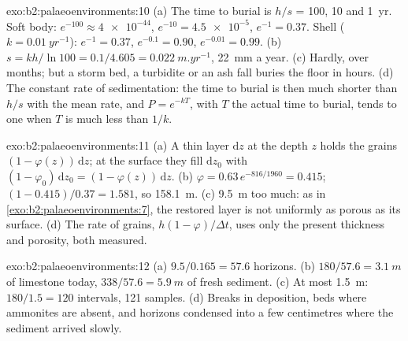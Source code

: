 \begin{solution}{exo:b2:palaeoenvironments:10}
(a) The time to burial is $h/s$ = 100, 10 and \qty{1}{yr}. Soft body: $e^{-100} \approx
\num{4e-44}$, $e^{-10} = \num{4.5e-5}$, $e^{-1} = 0.37$. Shell ($k = \qty{0.01}{yr^{-1}}$):
$e^{-1} = 0.37$, $e^{-0.1} = 0.90$, $e^{-0.01} = 0.99$. (b) $s = kh/\ln 100 = 0.1/4.605 =
\qty{0.022}{m.yr^{-1}}$, \qty{22}{mm} a year. (c) Hardly, over months; but a storm bed, a
turbidite or an ash fall buries the floor in hours. (d) The constant rate of sedimentation: the
time to burial is then much shorter than $h/s$ with the mean rate, and $P = e^{-kT}$, with $T$
the actual time to burial, tends to one when $T$ is much less than $1/k$.
\end{solution}

\begin{solution}{exo:b2:palaeoenvironments:11}
(a) A thin layer $\mathrm dz$ at the depth $z$ holds the grains $(1 - \varphi(z))\,\mathrm dz$;
at the surface they fill $\mathrm dz_0$ with $(1 - \varphi_0)\,\mathrm dz_0 = (1 -
\varphi(z))\,\mathrm dz$. (b) $\varphi = 0.63\,e^{-816/1960} = 0.415$; $(1 - 0.415)/0.37 =
1.581$, so \qty{158.1}{m}. (c) \qty{9.5}{m} too much: as in \cref{exo:b2:palaeoenvironments:7},
the restored layer is not uniformly as porous as its surface. (d) The rate of grains,
$h(1-\varphi)/\Delta t$, uses only the present thickness and porosity, both measured.
\end{solution}

\begin{solution}{exo:b2:palaeoenvironments:12}
(a) $9.5/0.165 = 57.6$ horizons. (b) $180/57.6 = \qty{3.1}{m}$ of limestone today, $338/57.6 =
\qty{5.9}{m}$ of fresh sediment. (c) At most \qty{1.5}{m}: $180/1.5 = 120$ intervals, 121
samples. (d) Breaks in deposition, beds where ammonites are absent, and horizons condensed into
a few centimetres where the sediment arrived slowly.
\end{solution}


